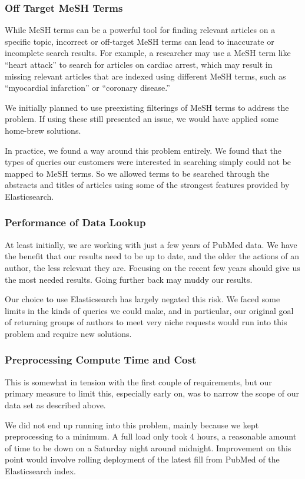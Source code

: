 \subsubsection{Off Target MeSH Terms}
While MeSH terms can be a powerful tool for finding relevant articles on a specific topic, incorrect or off-target MeSH terms can lead to inaccurate or incomplete search results. For example, a researcher may use a MeSH term like ``heart attack'' to search for articles on cardiac arrest, which may result in missing relevant articles that are indexed using different MeSH terms, such as ``myocardial infarction'' or ``coronary disease.'' 

We initially planned to use preexisting filterings of MeSH terms to address the problem. If using these still presented an issue, we would have applied some home-brew solutions. 

In practice, we found a way around this problem entirely. We found that the types of queries our customers were interested in searching simply could not be mapped to MeSH terms. So we allowed terms to be searched through the abstracts and titles of articles using some of the strongest features provided by Elasticsearch. 

\subsubsection{Performance of Data Lookup}
At least initially, we are working with just a few years of PubMed data. We have the benefit that our results need to be up to date, and the older the actions of an author, the less relevant they are. Focusing on the recent few years should give us the most needed results. Going further back may muddy our results. 

Our choice to use Elasticsearch has largely negated this risk. We faced some limits in the kinds of queries we could make, and in particular, our original goal of returning groups of authors to meet very niche requests would run into this problem and require new solutions. 

\subsubsection{Preprocessing Compute Time and Cost}
This is somewhat in tension with the first couple of requirements, but our primary measure to limit this, especially early on, was to narrow the scope of our data set as described above. 

We did not end up running into this problem, mainly because we kept preprocessing to a minimum. A full load only took 4 hours, a reasonable amount of time to be down on a Saturday night around midnight. Improvement on this point would involve rolling deployment of the latest fill from PubMed of the Elasticsearch index. 



